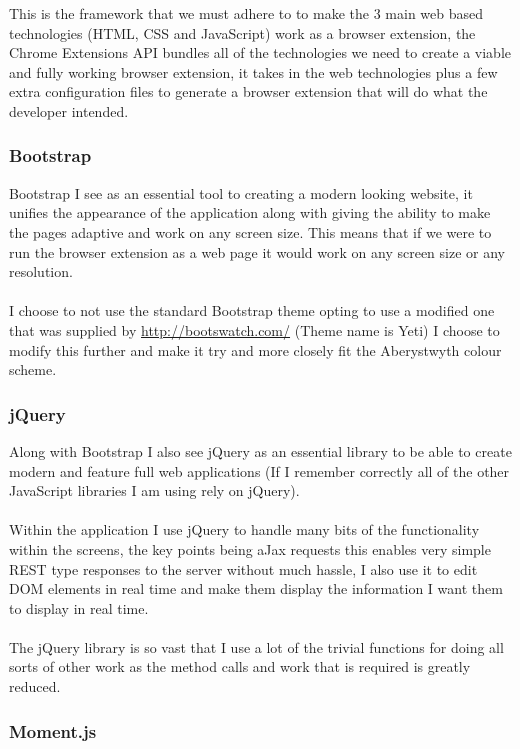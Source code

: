 \documentclass{article}
\begin{document}
This is the framework that we must adhere to to make the 3 main web based technologies (HTML, CSS and JavaScript) work as a browser extension, the Chrome Extensions API bundles all of the technologies we need to create a viable and fully working browser extension, it takes in the web technologies plus a few extra configuration files to generate a browser extension that will do what the developer intended.

\subsubsection{Bootstrap}

Bootstrap I see as an essential tool to creating a modern looking website, it unifies the appearance of the application along with giving the ability to make the pages adaptive and work on any screen size. This means that if we were to run the browser extension as a web page it would work on any screen size or any resolution.\\
\\
I choose to not use the standard Bootstrap theme opting to use a modified one that was supplied by \url{http://bootswatch.com/} (Theme name is Yeti) I choose to modify this further and make it try and more closely fit the Aberystwyth colour scheme.

\subsubsection{jQuery}

Along with Bootstrap I also see jQuery as an essential library to be able to create modern and feature full web applications (If I remember correctly all of the other JavaScript libraries I am using rely on jQuery).\\
\\
Within the application I use jQuery to handle many bits of the functionality within the screens, the key points being aJax requests this enables very simple REST type responses to the server without much hassle, I also use it to edit DOM elements in real time and make them display the information I want them to display in real time.\\
\\
The jQuery library is so vast that I use a lot of the trivial functions for doing all sorts of other work as the method calls and work that is required is greatly reduced.

\subsubsection{Moment.js}
\end{document}
